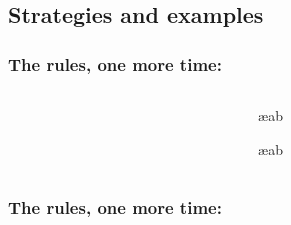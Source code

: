 \begin{frame}
  \begin{fitchproof}
    \open
    \open
    \open
    \close
    \close
    \close
  \end{fitchproof}
\end{frame}

\subsection{Strategies and examples}

\begin{frame}
  \frametitle{The rules, one more time: \eand}
\begin{columns}
  \begin{column}{3cm}
  \begin{fitchproof}
     
  \end{fitchproof}
\end{column}
\begin{column}{3cm}
  \begin{fitchproof}
     \ae{ab}
  \end{fitchproof}
  \begin{fitchproof}
     \ae{ab}
  \end{fitchproof}
\end{column}
\end{columns}
\end{frame}

\begin{frame}
  \frametitle{The rules, one more time: \eif}
\begin{columns}
  \begin{column}{3cm}
    \begin{fitchproof}
      \open
      \ellipsesline
      \close
       
    \end{fitchproof}
  \end{column}
  \begin{column}{3cm}
    \begin{fitchproof}
       
    \end{fitchproof}
  \end{column}
\end{columns}
\end{frame}

